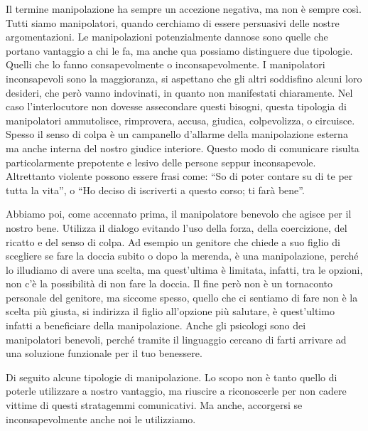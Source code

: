\documentclass[12pt]{book} %
\begin{document}
\bigskip

Il termine manipolazione ha sempre un accezione negativa, ma non è sempre così. Tutti siamo manipolatori, quando
cerchiamo di essere persuasivi delle nostre argomentazioni. 
Le manipolazioni potenzialmente dannose sono quelle che portano vantaggio a
chi le fa, ma anche qua possiamo distinguere due tipologie. Quelli che lo fanno consapevolmente o inconsapevolmente.
I manipolatori inconsapevoli sono la maggioranza, si aspettano che gli altri soddisfino alcuni loro desideri, che però
vanno indovinati, in quanto non manifestati chiaramente. Nel caso l'interlocutore non dovesse
assecondare questi bisogni, questa tipologia di manipolatori ammutolisce, rimprovera, accusa, giudica, colpevolizza,
o circuisce. Spesso il senso di colpa è un campanello d'allarme della manipolazione esterna ma
anche interna del nostro giudice interiore. Questo modo di comunicare risulta particolarmente prepotente e lesivo delle
persone seppur inconsapevole. Altrettanto violente possono essere frasi come: “So di poter contare su di te per tutta
la vita”, o “Ho deciso di iscriverti a questo corso; ti farà bene”. 

\bigskip

Abbiamo poi, come accennato prima, il manipolatore benevolo che agisce per il nostro bene. Utilizza il dialogo evitando
l'uso della forza, della coercizione, del ricatto e del senso di colpa. Ad esempio un genitore che
chiede a suo figlio di scegliere se fare la doccia subito o dopo la merenda, è una manipolazione, perché lo illudiamo
di avere una scelta, ma quest'ultima è limitata, infatti, tra le opzioni, non
c'è la possibilità di non fare la doccia. Il fine però non è un tornaconto personale del genitore,
ma siccome spesso, quello che ci sentiamo di fare non è la scelta più giusta, si indirizza il figlio
all'opzione più salutare, è quest'ultimo infatti a beneficiare della
manipolazione. Anche gli psicologi sono dei manipolatori benevoli, perché tramite il linguaggio cercano di farti
arrivare ad una soluzione funzionale per il tuo benessere.

\bigskip

Di seguito alcune tipologie di manipolazione. Lo scopo non è tanto quello di poterle utilizzare a nostro vantaggio, ma
riuscire a riconoscerle per non cadere vittime di questi stratagemmi comunicativi. Ma anche, accorgersi se
inconsapevolmente anche noi le utilizziamo.
\end{document}
